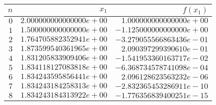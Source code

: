 \begin{tabular}{| r | r | r |}
\hline
$n$ & $x_1$ & $f(x_1)$\\
\hline
$   0$ & $  2.000000000000000e+00$ & $  1.000000000000000e+00$\\
$   1$ & $  1.500000000000000e+00$ & $ -1.125000000000000e+00$\\
$   2$ & $  1.764705882352941e+00$ & $ -3.279055566863436e-01$\\
$   3$ & $  1.873599540361965e+00$ & $  2.090397299390610e-01$\\
$   4$ & $  1.831205833909406e+00$ & $ -1.541953360163717e-02$\\
$   5$ & $  1.834118127083818e+00$ & $ -6.368734578741098e-04$\\
$   6$ & $  1.834243595856441e+00$ & $  2.096128623563232e-06$\\
$   7$ & $  1.834243184258313e+00$ & $ -2.832365453286911e-10$\\
$   8$ & $  1.834243184313922e+00$ & $ -1.776356839400251e-15$\\
\hline
\end{tabular}
